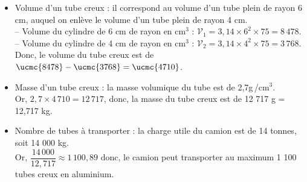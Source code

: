 \begin{itemize}
   \item Volume d'un tube creux : il correspond au volume d'un tube plein de rayon 6 cm, auquel on enlève le volume d'un tube plein de rayon 4 cm. \\
   -- Volume du cylindre de 6 cm de rayon en cm$^3$ : $\mathcal{V}_1= 3,14\times6^2\times75 =8\,478$. \\
   -- Volume du cylindre de 4 cm de rayon  en cm$^3$ : $\mathcal{V}_2= 3,14\times4^2\times75 =3\,768$. \\
   Donc, le volume du tube creux est de $\ucmc{8478}-\ucmc{3768} = \ucmc{4710}$.
   \item Masse d'un tube creux : la masse volumique du tube est de 2,7g\,\slash cm$^3$. \\
   Or, $2,7\times4\,710 =12\,717$, donc, la masse du tube creux est de 12 717 g = 12,717 kg.
   \item Nombre de tubes à transporter : la charge utile du camion est de 14 tonnes, soit 14 000 kg. \\ [1mm]
   Or, $\dfrac{14\,000}{12,717} \approx1\,100,89$ donc, {\blue le camion peut transporter au maximum 1 100 tubes creux en aluminium.}
\end{itemize}
